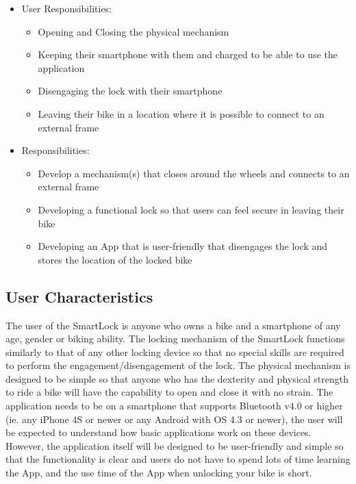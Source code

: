 \documentclass[12pt]{article}
\begin{document}
\begin{itemize}
\item User Responsibilities:
\begin{itemize}
\item Opening and Closing the physical mechanism
\item Keeping their smartphone with them and charged to be able to use the application
\item Disengaging the lock with their smartphone
\item Leaving their bike in a location where it is possible to connect to an external frame
\end{itemize}
\item \progname{} Responsibilities:
\begin{itemize}
\item Develop a mechanism(s) that closes around the wheels and connects to an external frame
\item Developing a functional lock so that users can feel secure in leaving their bike
\item Developing an App that is user-friendly that disengages the lock and stores the location of the locked bike
\end{itemize}
\end{itemize}

\subsection{User Characteristics} \label{SecUserCharacteristics}


The user of the SmartLock is anyone who owns a bike and a smartphone of any age, gender or biking ability.  The locking mechanism of the SmartLock functions similarly to that of any other locking device so that no special skills are required to perform the engagement/disengagement of the lock.  The physical mechanism is designed to be simple so that anyone who has the dexterity and physical strength to ride a bike will have the capability to open and close it with no strain.  The application needs to be on a smartphone that supports Bluetooth v4.0 or higher (ie. any iPhone 4S or newer or any Android with OS 4.3 or newer), the user will be expected to understand how basic applications work on these devices.  However, the application itself will be designed to be user-friendly and simple so that the functionality is clear and users do not have to spend lots of time learning the App, and the use time of the App when unlocking your bike is short. 
\end{document}
